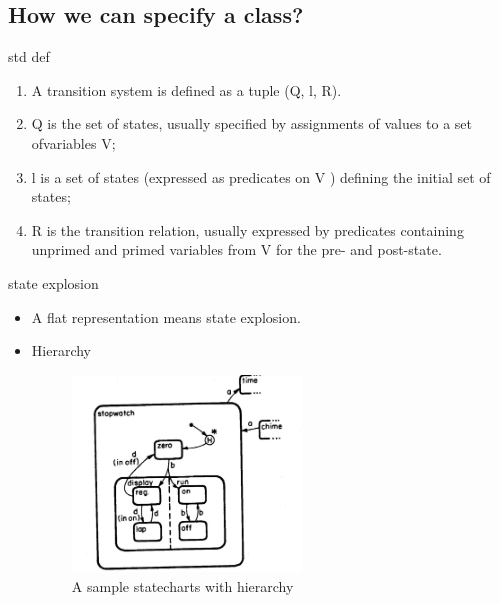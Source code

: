 ﻿\documentclass{beamer}
\begin{document}
\subsection{How we can specify a class?}
\begin{frame}{std def}
  \begin{enumerate}
  \item  A transition system is defined as a tuple (Q, l, R). \pause
  \item  Q is the set of states, usually specified by assignments of values to a set ofvariables V; \pause
  \item  l is a set of states (expressed as predicates on V ) defining the initial set of states; \pause
  \item  R is the transition relation, usually expressed by predicates containing unprimed and primed variables from V for the pre- and post-state. 
  \end{enumerate}
\end{frame}
\begin{frame}{state explosion}
  \begin{itemize}
  \item A flat representation means state explosion. \pause
  \item Hierarchy \pause
    \begin{figure}
      \includegraphics[width=2.4in]{img/1.JPG}
      \caption{A sample statecharts with hierarchy}
    \end{figure}
  \end{itemize}
\end{frame}
\end{document}

